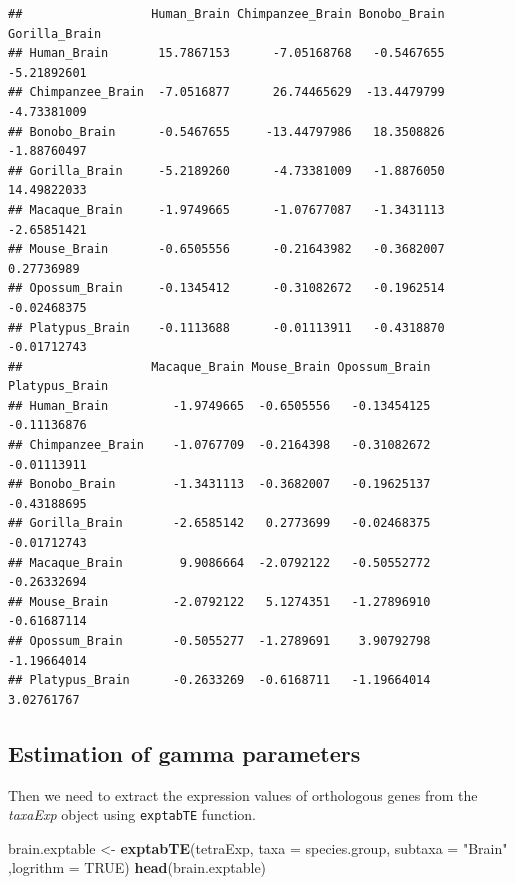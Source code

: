 \documentclass[]{book}
\newenvironment{Shaded}{\begin{snugshade}}{\end{snugshade}}
\newcommand{\DataTypeTok}[1]{\textcolor[rgb]{0.13,0.29,0.53}{#1}}
\newcommand{\KeywordTok}[1]{\textcolor[rgb]{0.13,0.29,0.53}{\textbf{#1}}}
\newcommand{\NormalTok}[1]{#1}
\newcommand{\OtherTok}[1]{\textcolor[rgb]{0.56,0.35,0.01}{#1}}
\newcommand{\StringTok}[1]{\textcolor[rgb]{0.31,0.60,0.02}{#1}}
\begin{document}
\begin{verbatim}
##                  Human_Brain Chimpanzee_Brain Bonobo_Brain Gorilla_Brain
## Human_Brain       15.7867153      -7.05168768   -0.5467655   -5.21892601
## Chimpanzee_Brain  -7.0516877      26.74465629  -13.4479799   -4.73381009
## Bonobo_Brain      -0.5467655     -13.44797986   18.3508826   -1.88760497
## Gorilla_Brain     -5.2189260      -4.73381009   -1.8876050   14.49822033
## Macaque_Brain     -1.9749665      -1.07677087   -1.3431113   -2.65851421
## Mouse_Brain       -0.6505556      -0.21643982   -0.3682007    0.27736989
## Opossum_Brain     -0.1345412      -0.31082672   -0.1962514   -0.02468375
## Platypus_Brain    -0.1113688      -0.01113911   -0.4318870   -0.01712743
##                  Macaque_Brain Mouse_Brain Opossum_Brain Platypus_Brain
## Human_Brain         -1.9749665  -0.6505556   -0.13454125    -0.11136876
## Chimpanzee_Brain    -1.0767709  -0.2164398   -0.31082672    -0.01113911
## Bonobo_Brain        -1.3431113  -0.3682007   -0.19625137    -0.43188695
## Gorilla_Brain       -2.6585142   0.2773699   -0.02468375    -0.01712743
## Macaque_Brain        9.9086664  -2.0792122   -0.50552772    -0.26332694
## Mouse_Brain         -2.0792122   5.1274351   -1.27896910    -0.61687114
## Opossum_Brain       -0.5055277  -1.2789691    3.90792798    -1.19664014
## Platypus_Brain      -0.2633269  -0.6168711   -1.19664014     3.02761767
\end{verbatim}

\hypertarget{estimation-of-gamma-parameters}{%
\subsection{Estimation of gamma parameters}\label{estimation-of-gamma-parameters}}

Then we need to extract the expression values of orthologous genes from the \emph{taxaExp} object using \texttt{exptabTE} function.

\begin{Shaded}
\begin{Highlighting}[]
\NormalTok{brain.exptable <-}\StringTok{ }\KeywordTok{exptabTE}\NormalTok{(tetraExp, }\DataTypeTok{taxa =}\NormalTok{ species.group, }\DataTypeTok{subtaxa =} \StringTok{"Brain"}\NormalTok{ ,}\DataTypeTok{logrithm =} \OtherTok{TRUE}\NormalTok{)}
\KeywordTok{head}\NormalTok{(brain.exptable)}
\end{Highlighting}
\end{Shaded}
\end{document}
